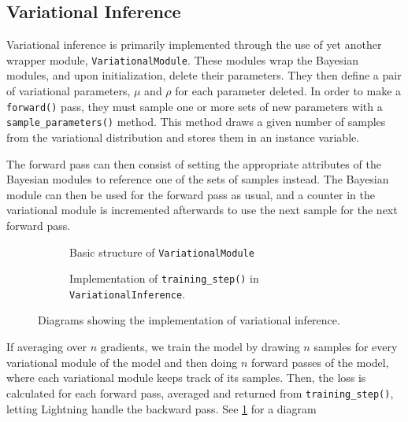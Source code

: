 \subsection{Variational Inference}
Variational inference is primarily implemented through the use of yet another wrapper module, \texttt{VariationalModule}.
These modules wrap the Bayesian modules, and upon initialization, delete their parameters.
They then define a pair of variational parameters, $\mu$ and $\rho$ for each parameter deleted. 
In order to make a \texttt{forward()} pass, they must sample one or more sets of new parameters with a \texttt{sample\_parameters()} method.
This method draws a given number of samples from the variational distribution and stores them in an instance variable.

The forward pass can then consist of setting the appropriate attributes of the Bayesian modules to reference one of the sets of samples instead. 
The Bayesian module can then be used for the forward pass as usual, and a counter in the variational module is incremented afterwards to use the next sample for the next forward pass.
\begin{figure}[htbp]
    \centering
    \begin{subfigure}[b]{0.48\linewidth}
        \centering
        \caption{Basic structure of \texttt{VariationalModule}}
        
    \end{subfigure}
    \begin{subfigure}[b]{0.48\linewidth}
        \centering
        \caption{Implementation of \texttt{training\_step()} in \texttt{VariationalInference}.}
        
    \end{subfigure}
    \caption{Diagrams showing the implementation of variational inference.}
    \label{fig:vi-arch}
\end{figure}
If averaging over $n$ gradients, we train the model by drawing $n$ samples for every variational module of the model and then doing $n$ forward passes of the model, where each variational module keeps track of its samples.
Then, the loss is calculated for each forward pass, averaged and returned from \texttt{training\_step()}, letting Lightning handle the backward pass. 
See \cref{fig:vi-arch} for a diagram 

